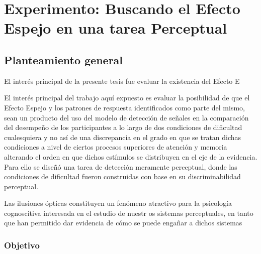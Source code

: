 
\chapter{Experimento: Buscando el Efecto Espejo en una tarea Perceptual} %

\label{Cap_Exp} %

\section{Planteamiento general}

El interés principal de la presente tesis fue evaluar la existencia del Efecto E

El interés principal del trabajo aquí expuesto es evaluar la posibilidad de que el Efecto Espejo y los patrones de respuesta identificados como parte del mismo, sean un producto del uso del modelo de detección de señales en la comparación del desempeño de los participantes a lo largo de dos condiciones de dificultad cualesquiera y no así de una discrepancia en el grado en que se tratan dichas condiciones a nivel de ciertos procesos superiores de atención y memoria alterando el orden en que dichos estímulos se distribuyen en el eje de la evidencia. Para ello se diseñó una tarea de detección meramente perceptual, donde las condiciones de dificultad fueron construidas con base en su discriminabilidad perceptual. 

Las ilusiones ópticas constituyen un fenómeno atractivo para la psicología cognoscitiva interesada en el estudio de nuestr os sistemas perceptuales, en tanto que han permitido dar evidencia de cómo se puede engañar a dichos sistemas 


\subsection{Objetivo}

